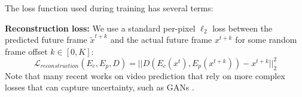 \documentclass{article}
\begin{document}

The loss function used during training has several terms:

\textbf{Reconstruction loss:}
We use a standard per-pixel $\ell_2$ loss between the predicted future frame $\tilde{x}^{t+k}$ and the actual future frame $x^{t+k}$ for some random frame offset $k \in [0,K]$:
\begin{equation}
    \mathcal{L}_{reconstruction}(E_c, E_p, D) =  ||D(E_c(x^t), E_p(x^{t+k})) - x^{t+k}||^2_2
\end{equation}
Note that many recent works on video prediction that rely on more complex losses that can capture uncertainty, such as GANs \cite{mathieu2016, goodfellow2014}.
\end{document}

